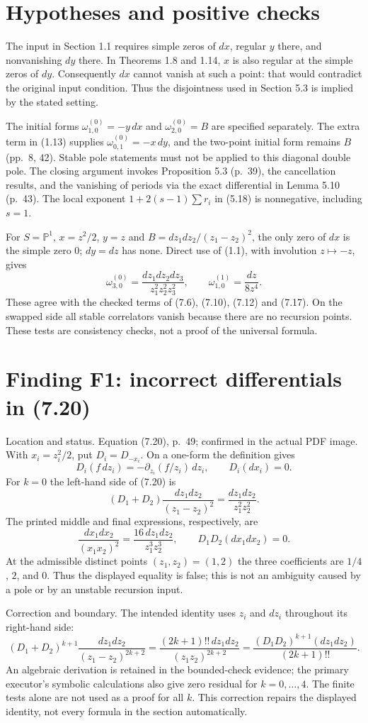 \documentclass[10pt]{article}
\begin{document}
\section*{Hypotheses and positive checks}
The input in Section 1.1 requires simple zeros of \(dx\), regular \(y\) there, and nonvanishing \(dy\) there. In Theorems 1.8 and 1.14, \(x\) is also regular at the simple zeros of \(dy\). Consequently \(dx\) cannot vanish at such a point: that would contradict the original input condition. Thus the disjointness used in Section 5.3 is implied by the stated setting.\par
The initial forms \(\omega_{1,0}^{(0)}=-y\,dx\) and \(\omega_{2,0}^{(0)}=B\) are specified separately. The extra term in (1.13) supplies \(\omega_{0,1}^{(0)}=-x\,dy\), and the two-point initial form remains \(B\) (pp. 8, 42). Stable pole statements must not be applied to this diagonal double pole. The closing argument invokes Proposition 5.3 (p. 39), the cancellation results, and the vanishing of periods via the exact differential in Lemma 5.10 (p. 43). The local exponent \(1+2(s-1)\sum r_i\) in (5.18) is nonnegative, including \(s=1\).\par
For \(S=\mathbb P^1\), \(x=z^2/2\), \(y=z\) and \(B=dz_1dz_2/(z_1-z_2)^2\), the only zero of \(dx\) is the simple zero \(0\); \(dy=dz\) has none. Direct use of (1.1), with involution \(z\mapsto-z\), gives \[\omega_{3,0}^{(0)}=\frac{dz_1dz_2dz_3}{z_1^2z_2^2z_3^2},
 \qquad
 \omega_{1,0}^{(1)}=\frac{dz}{8z^4}.\] These agree with the checked terms of (7.6), (7.10), (7.12) and (7.17). On the swapped side all stable correlators vanish because there are no recursion points. These tests are consistency checks, not a proof of the universal formula.\par
\section*{Finding F1: incorrect differentials in (7.20)}
Location and status. Equation (7.20), p. 49; confirmed in the actual PDF image. With \(x_i=z_i^2/2\), put \(D_i=D_{-x_i}\). On a one-form the definition gives \[D_i(f\,dz_i)=-\partial_{z_i}(f/z_i)\,dz_i,
 \qquad D_i(dx_i)=0.\] For \(k=0\) the left-hand side of (7.20) is \[(D_1+D_2)\frac{dz_1dz_2}{(z_1-z_2)^2}
       =\frac{dz_1dz_2}{z_1^2z_2^2}.\] The printed middle and final expressions, respectively, are \[\frac{dx_1dx_2}{(x_1x_2)^2}
       =\frac{16\,dz_1dz_2}{z_1^3z_2^3},
 \qquad D_1D_2(dx_1dx_2)=0.\] At the admissible distinct points \((z_1,z_2)=(1,2)\) the three coefficients are \(1/4\), \(2\), and \(0\). Thus the displayed equality is false; this is not an ambiguity caused by a pole or by an unstable recursion input.\par
Correction and boundary. The intended identity uses \(z_i\) and \(dz_i\) throughout its right-hand side: \[(D_1+D_2)^{k+1}\frac{dz_1dz_2}{(z_1-z_2)^{2k+2}}
 =\frac{(2k+1)!!\,dz_1dz_2}{(z_1z_2)^{2k+2}}
 =\frac{(D_1D_2)^{k+1}(dz_1dz_2)}{(2k+1)!!}.\] An algebraic derivation is retained in the bounded-check evidence; the primary executor’s symbolic calculations also give zero residual for \(k=0,\ldots,4\). The finite tests alone are not used as a proof for all \(k\). This correction repairs the displayed identity, not every formula in the section automatically.\par
\end{document}

